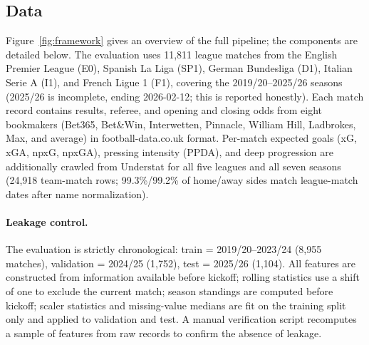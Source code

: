 \label{sec:method}

\subsection{Data}
\label{sec:data}
Figure~\ref{fig:framework} gives an overview of the full pipeline; the
components are detailed below. The evaluation uses 11,811 league matches from the English Premier League (E0),
Spanish La Liga (SP1), German Bundesliga (D1), Italian Serie A (I1),
and French Ligue 1 (F1), covering the 2019/20--2025/26 seasons
(2025/26 is incomplete, ending 2026-02-12; this is reported honestly).
Each match record contains results, referee, and opening and closing
odds from eight bookmakers (Bet365, Bet\&Win, Interwetten, Pinnacle,
William Hill, Ladbrokes, Max, and average) in football-data.co.uk
format. Per-match expected goals (xG, xGA,
npxG, npxGA), pressing intensity (PPDA), and deep progression are
additionally crawled from Understat for all five leagues and all seven seasons
(24,918 team-match rows; 99.3\%/99.2\% of home/away sides match
league-match dates after name normalization).

\paragraph{Leakage control.}
The evaluation is strictly chronological:
train = 2019/20--2023/24 (8,955 matches), validation = 2024/25
(1,752), test = 2025/26 (1,104). All features are constructed from
information available before kickoff; rolling statistics use a
shift of one to exclude the current match; season standings are
computed before kickoff; scaler statistics and missing-value medians
are fit on the training split only and applied to validation and
test. A manual verification script recomputes a sample of features
from raw records to confirm the absence of leakage.

